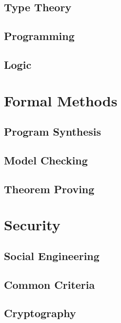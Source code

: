 \documentclass{book}
\begin{document}
  \chapter{Type Theory}\label{sec:sd:typetheory}
  

  \chapter{Programming}
  

  \chapter{Logic}
  
  
\part{Formal Methods}

  \chapter{Program Synthesis} 

  \chapter{Model Checking} 
    

  \chapter{Theorem Proving} 
   

\part{Security}

  \chapter{Social Engineering}

  \chapter{Common Criteria}

  \chapter{Cryptography}
    
\end{document}
